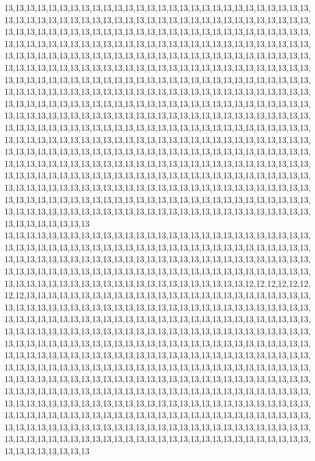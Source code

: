 13,13,13,13,13,13,13,13,13,13,13,13,13,13,13,13,13,13,13,13,13,13,13,13,13,13,13,13,13,13,13,13,13,13,13,13,13,13,13,13,13,13,13,13,13,13,13,13,13,13,13,13,13,13,13,13,13,13,13,13,13,13,13,13,13,13,13,13,13,13,13,13,13,13,13,13,13,13,13,13,13,13,13,13,13,13,13,13,13,13,13,13,13,13,13,13,13,13,13,13,13,13,13,13,13,13,13,13,13,13,13,13,13,13,13,13,13,13,13,13,13,13,13,13,13,13,13,13,13,13,13,13,13,13,13,13,13,13,13,13,13,13,13,13,13,13,13,13,13,13,13,13,13,13,13,13,13,13,13,13,13,13,13,13,13,13,13,13,13,13,13,13,13,13,13,13,13,13,13,13,13,13,13,13,13,13,13,13,13,13,13,13,13,13,13,13,13,13,13,13,13,13,13,13,13,13,13,13,13,13,13,13,13,13,13,13,13,13,13,13,13,13,13,13,13,13,13,13,13,13,13,13,13,13,13,13,13,13,13,13,13,13,13,13,13,13,13,13,13,13,13,13,13,13,13,13,13,13,13,13,13,13,13,13,13,13,13,13,13,13,13,13,13,13,13,13,13,13,13,13,13,13,13,13,13,13,13,13,13,13,13,13,13,13,13,13,13,13,13,13,13,13,13,13,13,13,13,13,13,13,13,13,13,13,13,13,13,13,13,13,13,13,13,13,13,13,13,13,13,13,13,13,13,13,13,13,13,13,13,13,13,13,13,13,13,13,13,13,13,13,13,13,13,13,13,13,13,13,13,13,13,13,13,13,13,13,13,13,13,13,13,13,13,13,13,13,13,13,13,13,13,13,13,13,13,13,13,13,13,13,13,13,13,13,13,13,13,13,13,13,13,13,13,13,13,13,13,13,13,13,13,13,13,13,13,13,13,13,13,13,13,13,13,13,13,13,13,13,13,13,13,13,13,13,13,13,13,13,13,13,13,13,13,13,13,13,13,13,13,13,13,13,13,13,13,13,13,13,13,13,13,13,13,13,13,13,13,13,13,13,13,13,13,13,13,13,13,13,13,13,13,13,13,13,13,13,13,13,13,13,13,13,13,13,13,13,13,13,13,13,13,13,13,13,13,13,13,13,13,13,13,13
13,13,13,13,13,13,13,13,13,13,13,13,13,13,13,13,13,13,13,13,13,13,13,13,13,13,13,13,13,13,13,13,13,13,13,13,13,13,13,13,13,13,13,13,13,13,13,13,13,13,13,13,13,13,13,13,13,13,13,13,13,13,13,13,13,13,13,13,13,13,13,13,13,13,13,13,13,13,13,13,13,13,13,13,13,13,13,13,13,13,13,13,13,13,13,13,13,13,13,13,13,13,13,13,13,13,13,13,13,13,13,13,13,13,13,13,13,13,13,13,13,13,13,13,13,13,13,13,13,13,13,13,13,13,12,12,12,12,12,12,12,12,13,13,13,13,13,13,13,13,13,13,13,13,13,13,13,13,13,13,13,13,13,13,13,13,13,13,13,13,13,13,13,13,13,13,13,13,13,13,13,13,13,13,13,13,13,13,13,13,13,13,13,13,13,13,13,13,13,13,13,13,13,13,13,13,13,13,13,13,13,13,13,13,13,13,13,13,13,13,13,13,13,13,13,13,13,13,13,13,13,13,13,13,13,13,13,13,13,13,13,13,13,13,13,13,13,13,13,13,13,13,13,13,13,13,13,13,13,13,13,13,13,13,13,13,13,13,13,13,13,13,13,13,13,13,13,13,13,13,13,13,13,13,13,13,13,13,13,13,13,13,13,13,13,13,13,13,13,13,13,13,13,13,13,13,13,13,13,13,13,13,13,13,13,13,13,13,13,13,13,13,13,13,13,13,13,13,13,13,13,13,13,13,13,13,13,13,13,13,13,13,13,13,13,13,13,13,13,13,13,13,13,13,13,13,13,13,13,13,13,13,13,13,13,13,13,13,13,13,13,13,13,13,13,13,13,13,13,13,13,13,13,13,13,13,13,13,13,13,13,13,13,13,13,13,13,13,13,13,13,13,13,13,13,13,13,13,13,13,13,13,13,13,13,13,13,13,13,13,13,13,13,13,13,13,13,13,13,13,13,13,13,13,13,13,13,13,13,13,13,13,13,13,13,13,13,13,13,13,13,13,13,13,13,13,13,13,13,13,13,13,13,13,13,13,13,13,13,13,13,13,13,13,13,13,13,13,13,13,13,13,13,13,13,13,13,13,13,13,13,13,13,13,13,13,13,13,13,13,13,13,13,13,13,13,13,13,13,13,13,13

